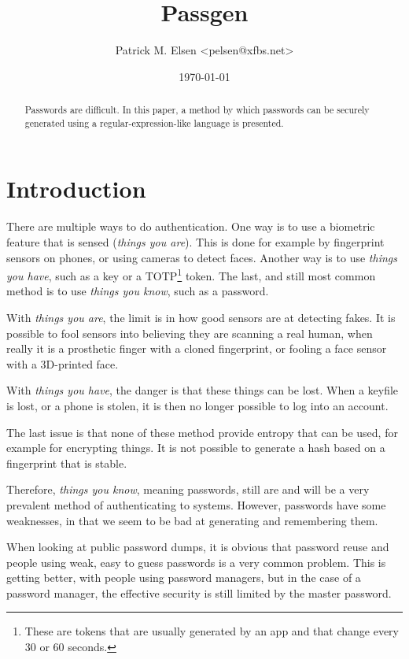 \documentclass[a4paper,twocolumn]{article}
\title{Passgen}
\author{Patrick M. Elsen <pelsen@xfbs.net>}
\date{\today}
\begin{document}
\maketitle
\begin{abstract}
  Passwords are difficult. In this paper, a method by which passwords can be securely generated using a regular-expression-like language is presented.
\end{abstract}

\tableofcontents

\section{Introduction}

There are multiple ways to do authentication. One way is to use a biometric feature that is sensed (\emph{things you are}). This is done for example by fingerprint sensors on phones, or using cameras to detect faces. Another way is to use \emph{things you have}, such as a key or a TOTP\footnote{These are tokens that are usually generated by an app and that change every 30 or 60 seconds.} token. The last, and still most common method is to use \emph{things you know}, such as a password.

With \emph{things you are}, the limit is in how good sensors are at detecting fakes. It is possible to fool sensors into believing they are scanning a real human, when really it is a prosthetic finger with a cloned fingerprint, or fooling a face sensor with a 3D-printed face.

With \emph{things you have}, the danger is that these things can be lost. When a keyfile is lost, or a phone is stolen, it is then no longer possible to log into an account.

The last issue is that none of these method provide entropy that can be used, for example for encrypting things. It is not possible to generate a hash based on a fingerprint that is stable. 

Therefore, \emph{things you know}, meaning passwords, still are and will be a very prevalent method of authenticating to systems. However, passwords have some weaknesses, in that we seem to be bad at generating and remembering them.

When looking at public password dumps, it is obvious that password reuse and people using weak, easy to guess passwords is a very common problem. This is getting better, with people using password managers, but in the case of a password manager, the effective security is still limited by the master password.
\end{document}
